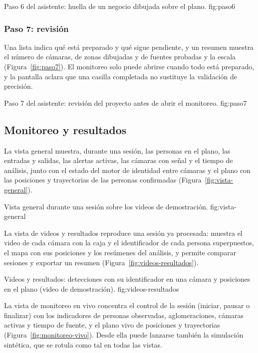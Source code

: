   {Paso 6 del asistente: huella de un negocio dibujada sobre el plano.}
  {fig:paso6}

\subsubsection*{Paso 7: revisión}

Una lista indica qué está preparado y qué sigue pendiente, y un resumen muestra el número de
cámaras, de zonas dibujadas y de fuentes probadas y la escala (Figura~\ref{fig:paso7}). El
monitoreo solo puede abrirse cuando todo está preparado, y la pantalla aclara que una casilla
completada no sustituye la validación de precisión.

  {Paso 7 del asistente: revisión del proyecto antes de abrir el monitoreo.}
  {fig:paso7}

\subsection{Monitoreo y resultados}
\label{subsec:diseno-monitoreo}

La vista general muestra, durante una sesión, las personas en el plano, las entradas y salidas,
las alertas activas, las cámaras con señal y el tiempo de análisis, junto con el estado del motor
de identidad entre cámaras y el plano con las posiciones y trayectorias de las personas
confirmadas (Figura~\ref{fig:vista-general}).

  {Vista general durante una sesión sobre los videos de demostración.}
  {fig:vista-general}

La vista de videos y resultados reproduce una sesión ya procesada: muestra el video de cada
cámara con la caja y el identificador de cada persona superpuestos, el mapa con sus posiciones
y los resúmenes del análisis, y permite comparar sesiones y exportar un resumen
(Figura~\ref{fig:videos-resultados}).

  {Videos y resultados: detecciones con su identificador en una cámara y posiciones en el plano
   (video de demostración).}
  {fig:videos-resultados}

La vista de monitoreo en vivo concentra el control de la sesión (iniciar, pausar o finalizar) con
los indicadores de personas observadas, aglomeraciones, cámaras activas y tiempo de fuente, y
el plano vivo de posiciones y trayectorias (Figura~\ref{fig:monitoreo-vivo}). Desde ella puede
lanzarse también la simulación sintética, que se rotula como tal en todas las vistas.

